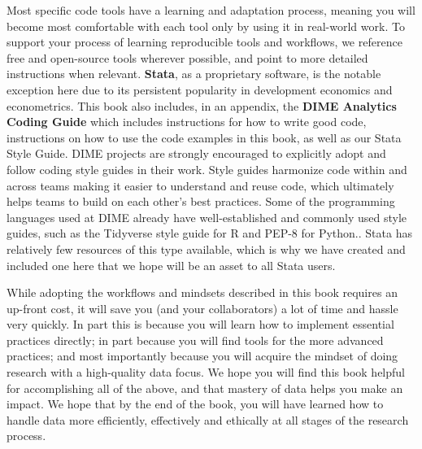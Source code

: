 Most specific code tools have a learning and adaptation process,
meaning you will become most comfortable with each tool
only by using it in real-world work.
To support your process of learning reproducible tools and workflows,
we reference free and open-source tools wherever possible,
and point to more detailed instructions when relevant.
\textbf{Stata},\cite{statacorp2019stata}
as a proprietary software, is the notable exception here
due to its persistent popularity in development economics and econometrics.
This book also includes, in an appendix,
the \textbf{DIME Analytics Coding Guide}
which includes instructions for how to write good code,
instructions on how to use the code examples in this book,
as well as our Stata Style Guide.
DIME projects are strongly encouraged to
explicitly adopt and follow coding style guides in their work.
Style guides harmonize code within and across teams
making it easier to understand and reuse code,
which ultimately helps teams to
build on each other's best practices.
Some of the programming languages used at DIME
already have well-established and commonly used style guides,
such as the Tidyverse style guide for R
and PEP-8 for Python..
Stata has relatively few resources of this type available,
which is why we have created and included one here that
we hope will be an asset to all Stata users.

While adopting the workflows and mindsets described in this book requires an up-front cost,
it will save you (and your collaborators) a lot of time and hassle very quickly.
In part this is because you will learn how to implement essential practices directly;
in part because you will find tools for the more advanced practices;
and most importantly because you will acquire the mindset of doing research with a high-quality data focus.
We hope you will find this book helpful for accomplishing all of the above,
and that mastery of data helps you make an impact.
We hope that by the end of the book,
you will have learned how to handle data more efficiently, effectively and ethically
at all stages of the research process.

\mainmatter
